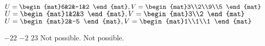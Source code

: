 \begin{Exercise}[
name={},
title={}, 
difficulty=0,
origin={\cite{GH}}]
\begin{multicols}{2}
\Question $U=\begin{mat}6&2&-1&2  \end{mat}, \\ V=\begin{mat}3\\2\\9\\5 \end{mat}$
\Question $U=\begin{mat}1&2&3  \end{mat}, \\ V=\begin{mat}3\\2 \end{mat}$
\Question $U=\begin{mat}2&-5  \end{mat}, \\ V=\begin{mat}1\\1\\1 \end{mat}$
\EndCurrentQuestion
\end{multicols}

\end{Exercise}

\begin{Answer}
\Question $-22$
\Question $-2$
\Question $23$
\Question Not possible.
\Question Not possible.
\end{Answer}

